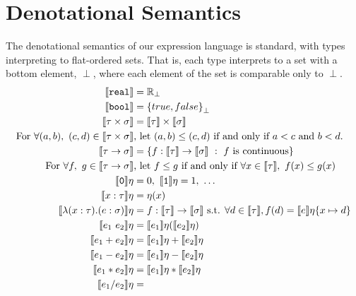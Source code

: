 \section{Denotational Semantics}
The denotational semantics of our expression language is  standard, with types interpreting to flat-ordered sets. 
That is, each type interprets to a set with a bottom element, $\perp$, where each element of the set is comparable
only to $\perp$. 
 \begin{align*}
\llbracket \texttt{real} \rrbracket &= \R_{\perp} \\
 \llbracket \texttt{bool} \rrbracket &= {\{true, false\}}_{\perp} \\
 \llbracket \tau \times \sigma \rrbracket &= \llbracket \tau \rrbracket \times \llbracket \sigma \rrbracket  \\
 \text{For } \forall (a, b), \ (c, d) \in \llbracket \tau \times \sigma \rrbracket &\text{, let }  (a,b) \leq (c,d) \text{ if and only if } a<c \text{ and } b<d. \\ 
 \llbracket \tau \rightarrow \sigma \rrbracket &= \{f: \llbracket \tau \rrbracket \rightarrow \llbracket \sigma \rrbracket \ : 
 \ f \text{ is continuous}\} \\
 \text{ For } \forall f, \ g \in \llbracket \tau \rightarrow \sigma \rrbracket &\text{, let } f \leq g \text{ if and only if } \forall x \in 
 \llbracket \tau \rrbracket, \ f(x) \leq g(x) \\
 \llbracket \texttt{0} \rrbracket\eta &= 0, \  \llbracket \texttt{1} \rrbracket\eta = 1, \ \ldots \\
  \llbracket x : \tau \rrbracket\eta &= \eta(x) \\
  \llbracket \lambda (x : \tau) . (e : \sigma) \rrbracket\eta &= f : \llbracket \tau \rrbracket \rightarrow \llbracket \sigma \rrbracket
\text{ s.t. } \forall d \in \llbracket \tau \rrbracket, f(d) = \llbracket e \rrbracket\eta\{ x \mapsto d \} \\
 \llbracket e_1 \ e_2 \rrbracket \eta &= \llbracket e_1 \rrbracket\eta ( \llbracket e_2 \rrbracket\eta ) \\
 \llbracket e_1 + e_2 \rrbracket\eta &= \llbracket e_1 \rrbracket\eta + \llbracket e_2 \rrbracket\eta \\
 \llbracket e_1 - e_2 \rrbracket\eta &= \llbracket e_1 \rrbracket\eta - \llbracket e_2 \rrbracket\eta \\
 \llbracket e_1 * e_2 \rrbracket\eta &= \llbracket e_1 \rrbracket\eta * \llbracket e_2 \rrbracket\eta \\
  \llbracket e_1 / e_2 \rrbracket\eta &=

\end{align*}
